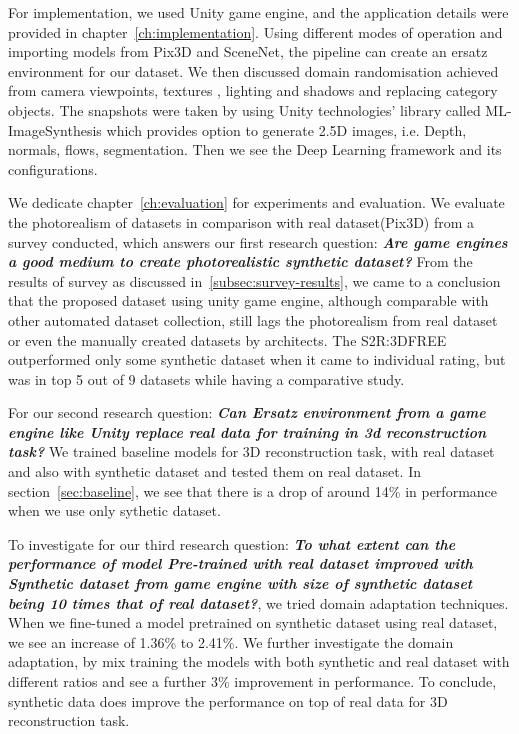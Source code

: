 For implementation, we used Unity game engine, and the application details were provided in chapter~\ref{ch:implementation}.
Using different modes of operation and importing models from Pix3D and SceneNet, the pipeline can create an ersatz environment for our dataset.
We then discussed domain randomisation achieved from camera viewpoints, textures , lighting and shadows and replacing category objects.
The snapshots were taken by using Unity technologies' library called ML-ImageSynthesis which provides option to generate 2.5D images, i.e. Depth, normals, flows, segmentation.
Then we see the Deep Learning framework and its configurations.

We dedicate chapter~\ref{ch:evaluation} for experiments and evaluation.
We evaluate the photorealism of datasets in comparison with real dataset(Pix3D) from a survey conducted, which answers our first research question:
\textbf{\emph{Are game engines a good medium to create photorealistic synthetic dataset?}} From the results of survey as discussed in~\ref{subsec:survey-results},
we came to a conclusion that the proposed dataset using unity game engine, although comparable with other automated dataset collection,
still lags the photorealism from real dataset or even the manually created datasets by architects.
The S2R:3DFREE outperformed only some synthetic dataset when it came to individual rating, but was in top 5 out of 9 datasets while having a comparative study.

For our second research question: \textbf{\emph{Can Ersatz environment from a game engine like Unity replace real data for training in 3d reconstruction task?}}
We trained baseline models for 3D reconstruction task, with real dataset and also with synthetic dataset and tested them on real dataset.
In section~\ref{sec:baseline}, we see that there is a drop of around 14\% in performance when we use only sythetic dataset.

To investigate for our third research question: \textbf{\emph{To what extent can the performance of model Pre-trained with real dataset improved with Synthetic dataset from game engine with size of synthetic dataset being
10 times that of real dataset?}}, we tried domain adaptation techniques.
When we fine-tuned a model pretrained on synthetic dataset using real dataset, we see an increase of 1.36\% to 2.41\%.
We further investigate the domain adaptation, by mix training the models with both synthetic and real dataset with different ratios and see a further 3\% improvement in performance.
To conclude, synthetic data does improve the performance on top of real data for 3D reconstruction task.

